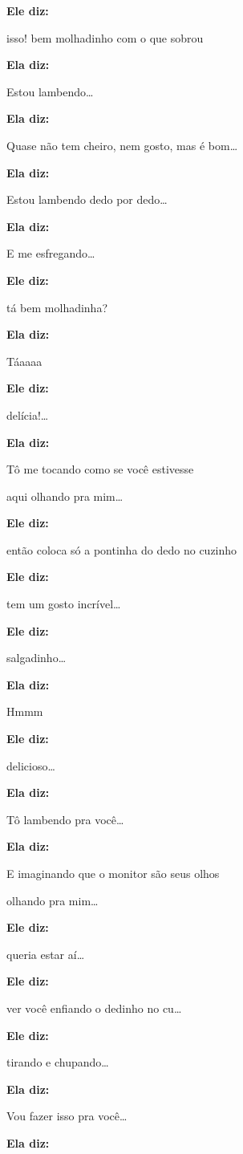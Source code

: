\textbf{Ele diz:}

isso! bem molhadinho com o que sobrou

\textbf{Ela diz:}

Estou lambendo…

\textbf{Ela diz:}

Quase não tem cheiro, nem gosto, mas é bom…

\textbf{Ela diz:}

Estou lambendo dedo por dedo…

\textbf{Ela diz:}

E me esfregando…

\textbf{Ele diz:}

tá bem molhadinha?

\textbf{Ela diz:}

Táaaaa

\textbf{Ele diz:}

delícia!…

\textbf{Ela diz:}

Tô me tocando como se você estivesse

aqui olhando pra mim…

\textbf{Ele diz:}

então coloca só a pontinha do dedo no cuzinho

\textbf{Ele diz:}

tem um gosto incrível…

\textbf{Ele diz:}

salgadinho…

\textbf{Ela diz:}

Hmmm

\textbf{Ele diz:}

delicioso…

\textbf{Ela diz:}

Tô lambendo pra você…

\textbf{Ela diz:}

E imaginando que o monitor são seus olhos

olhando pra mim…

\textbf{Ele diz:}

queria estar aí…

\textbf{Ele diz:}

ver você enfiando o dedinho no cu…

\textbf{Ele diz:}

tirando e chupando…

\textbf{Ela diz:}

Vou fazer isso pra você…

\textbf{Ela diz:}

